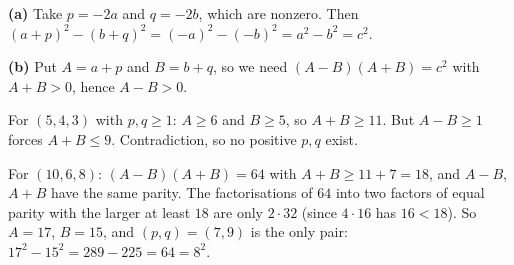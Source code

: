 \textbf{(a)} Take $p=-2a$ and $q=-2b$, which are nonzero. Then $(a+p)^2-(b+q)^2=(-a)^2-(-b)^2=a^2-b^2=c^2$.

\textbf{(b)} Put $A=a+p$ and $B=b+q$, so we need $(A-B)(A+B)=c^2$ with $A+B>0$, hence $A-B>0$.

For $(5,4,3)$ with $p,q\ge1$: $A\ge6$ and $B\ge5$, so $A+B\ge11$. But $A-B\ge1$ forces $A+B\le9$. Contradiction, so no positive $p,q$ exist.

For $(10,6,8)$: $(A-B)(A+B)=64$ with $A+B\ge11+7=18$, and $A-B$, $A+B$ have the same parity. The factorisations of $64$ into two factors of equal parity with the larger at least $18$ are only $2\cdot32$ (since $4\cdot16$ has $16<18$). So $A=17$, $B=15$, and $\boxed{(p,q)=(7,9)}$ is the only pair: $17^2-15^2=289-225=64=8^2$.
